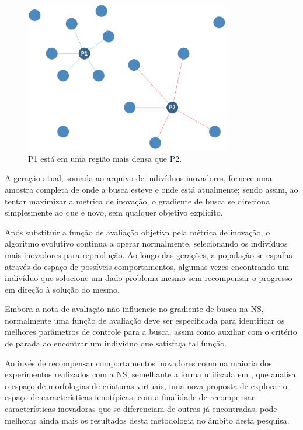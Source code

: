 \begin{figure}[htb]
	\begin{center}
		\includegraphics[width=0.8\textwidth]{Imagens/ns_dispersao.png}
		\caption{P1 está em uma região mais densa que P2.}
		\label{fig:ns_dispersao}
	\end{center}
\end{figure}

A geração atual, somada ao arquivo de indivíduos inovadores, fornece uma amostra completa de onde a busca esteve e onde está atualmente; sendo assim, ao tentar maximizar a métrica de inovação, o gradiente de busca se direciona simplesmente ao que é novo, sem qualquer objetivo explícito.

Após substituir a função de avaliação objetiva pela métrica de inovação, o algoritmo evolutivo continua a operar normalmente, selecionando os indivíduos mais inovadores para reprodução. Ao longo das gerações, a população se espalha através do espaço de possíveis comportamentos, algumas vezes encontrando um indivíduo que solucione um dado problema mesmo sem recompensar o progresso em direção à solução do mesmo.

Embora a nota de avaliação não influencie no gradiente de busca na NS, normalmente uma função de avaliação deve ser especificada para identificar os melhores parâmetros de controle para a busca, assim como auxiliar com o critério de parada ao encontrar um indivíduo que satisfaça tal função.

Ao invés de recompensar comportamentos inovadores como na maioria dos experimentos realizados com a NS, semelhante a forma utilizada em \cite{lehman2011evolving}, que analisa o espaço de morfologias de criaturas virtuais, uma nova proposta de explorar o espaço de características fenotípicas, com a finalidade de recompensar características inovadoras que se diferenciam de outras já encontradas, pode melhorar ainda mais os resultados desta metodologia no âmbito desta pesquisa.

